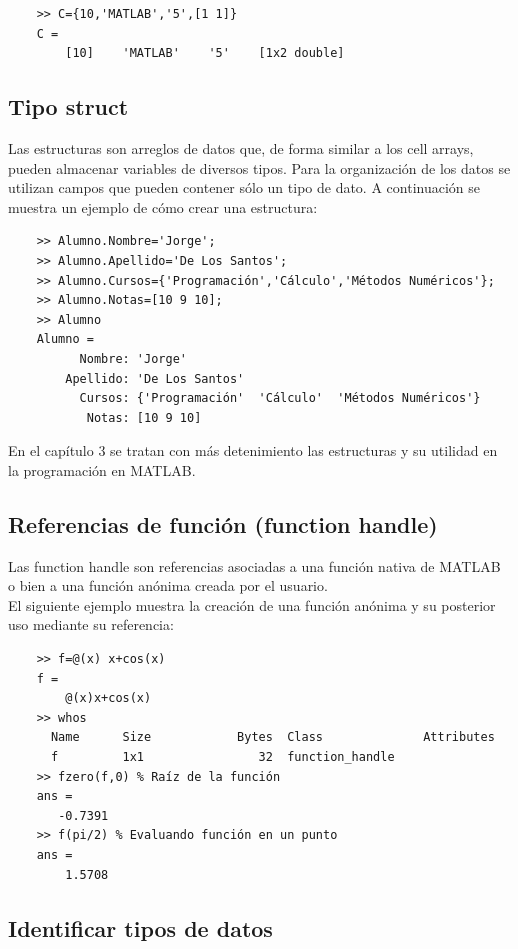 \begin{verbatim}
	>> C={10,'MATLAB','5',[1 1]}
	C = 
	    [10]    'MATLAB'    '5'    [1x2 double]
\end{verbatim}

\subsection{Tipo struct}

Las estructuras son arreglos de datos que, de forma similar a los cell arrays, pueden almacenar 
variables de diversos tipos. Para la organización de los datos se utilizan campos que pueden 
contener sólo un tipo de dato. A continuación se muestra un ejemplo de cómo crear una estructura:

\begin{verbatim}
	>> Alumno.Nombre='Jorge';
	>> Alumno.Apellido='De Los Santos';
	>> Alumno.Cursos={'Programación','Cálculo','Métodos Numéricos'};
	>> Alumno.Notas=[10 9 10];
	>> Alumno
	Alumno = 
	      Nombre: 'Jorge'
	    Apellido: 'De Los Santos'
	      Cursos: {'Programación'  'Cálculo'  'Métodos Numéricos'}
	       Notas: [10 9 10]
\end{verbatim}


En el capítulo 3 se tratan con más detenimiento las estructuras y su utilidad en la programación en MATLAB.


\subsection{Referencias de función (function handle)}

Las function handle son referencias asociadas a una función nativa de MATLAB o bien a una función 
anónima creada por el usuario.\\

El siguiente ejemplo muestra la creación de una función anónima y su posterior uso mediante su referencia:

\begin{verbatim}
	>> f=@(x) x+cos(x)
	f = 
	    @(x)x+cos(x)
	>> whos
	  Name      Size            Bytes  Class              Attributes
	  f         1x1                32  function_handle              
	>> fzero(f,0) % Raíz de la función 
	ans =
	   -0.7391
	>> f(pi/2) % Evaluando función en un punto
	ans =
	    1.5708
\end{verbatim}


\subsection{Identificar tipos de datos}

